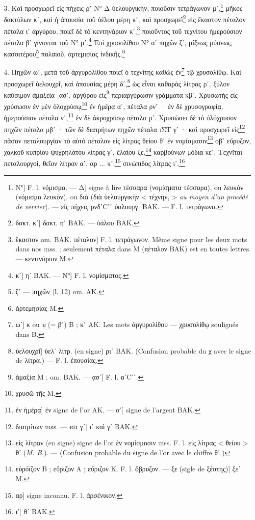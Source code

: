 \documentclass[a4paper, 11pt, oneside, polutonikogreek, french]{article}
\begin{document}
3. Καὶ προσχωρεῖ εἰς πήχεις ρʹ Ν° Δ ὑελουργικὴν, ποιοῦσιν τετράγωνον μʹ,\footnote{Ν°] F. l. νόμισμα. --- Δ] signe à lire τέσσαρα (νομίσματα τέσσαρα), ou λευκὸν (νόμισμα λευκὸν), ou διὰ (διὰ ὑελουργικὴν < τέχνην, > \emph{au moyen d'un procédé de verrier}). --- εἰς πήχεις ρνδʹCʹʹ ὑαλουργ. BAK. --- F. l. τετράγωνα.} μῆκος δακτύλων κʹ, καὶ ἡ ἀπουσία τοῦ ὑέλου μέρη κʹ, καὶ προσχωρεῖ\footnote{δακτ. κʹ] δακτ. ηʹ BAK. --- ὑάλου BAK.} εἰς ἕκαστον πέταλον πέταλα ιʹ ἀργύρου, ποιεῖ δὲ τὸ κεντηνάριον κʹ,\footnote{ἕκαστον om. BAK. πέταλον] F. l. τετράγωνον. Même signe pour les deux mots dans nos mss. ; seulement πέταλα dans M (πέταλον BAK) est en toutes lettres. --- κεντινάριον M.} ποιοῦντος τοῦ τεχνίτου ἡμερούσιον πέταλα βʹ γίνονται τοῦ Ν° μʹ.\footnote{κʹ] ηʹ BAK. --- Ν°] F. l. νομίσματος.} Ἐπὶ χρυσολίθου Ν° αʹ πηχῶν ζʹ, μίξεως μύσεως, κασσιτέρου\footnote{ζʹ --- πηχῶν (l. 12) om. AK.} παλαιοῦ, ἀρτεμισίας ἰνδικῆς.\footnote{ἀρτεμησίας M.}

4. Πηχῶν ωʹ, μετὰ τοῦ ἀργυρολίθου ποιεῖ ὁ τεχνίτης καθὼς ἐν\footnote{ωʹ] κ ou \emph{u} (= βʹ) B ; κʹ AΚ. Les mots ἀργυρολίθου --- χρυσολίθῳ soulignés dans B.} τῷ χρυσολίθῳ. Καὶ προσχωρεῖ ὑελουχρῖ, καὶ ἀπουσίας μέρη δʹ,\footnote{ὑελουχρῖ] ὑελʹ λίτρ. (en signe) ριʹ BAK. (Confusion probable du χ avec le signe de λίτρα.) --- F. l. ἐπουσίας.} ὡς εἶναι καθαρὰς λίτρας ρʹ, ξύλον καύσιμον ἁμαξεία ͵ασʹ, ἀργύρου εἰς\footnote{ἁμαξία M ; om. BAK. --- ᾳσʹ] F. l. αʹCʹʹ.} περιαργύρωσιν γράμματα κβʹ. Χρυσωτὴς εἰς χρύσωσιν ἐν μὲν ὁλοχρύσῳ\footnote{χρυσῶ τῆς M.} ἐν ἡμέρᾳ αʹ, πέταλα ρνʹ · ἐν δὲ χρυσογραφίᾳ, ἡμερούσιον πέταλα νʹ,\footnote{ἐν ἡμέρᾳ] ἐν signe de l'or AK. --- αʹ] signe de l'argent BAK.} ἐν δὲ ἀκροχρύσῳ πέταλα ρʹ. Χρυσώσει δὲ τὸ ὁλόχρυσον πηχῶν πέταλα μβʹ · τῶν δὲ διατρήτων πηχῶν πέταλα ιΣΤ γʹ · καὶ προσχωρεῖ εἰς\footnote{διατρίτων mss. --- ιστ γʹ] ιʹ καὶ γʹ BAK.} πᾶσαν πεταλουργίαν τὸ αὐτὸ πέταλον εἰς λίτρας θείου θʹ ἐν νομίσμασιν\footnote{εἰς λίτραν (en signe) signe de l'or ἐν νομίσμασιν mss. F. l. εἰς λίτρας < θείου > θʹ (\emph{M. B.}). --- (Confusion probable du signe de l'or avec le chiffre θʹ.)} οβʹ εὔρυζον, χαλκοῦ κυπρίου ψυχρηλάτου λίτρας γʹ, ἐλαίου ξε,\footnote{εὐρόϊζον B ; εὕριζον A ; εὔριζον K. F. l. ὄβρυζον. --- ξε (sigle de ξέστης)] ξεʹ M.} καρβούνων μόδια κεʹ. Τεχνῖται πεταλουργοὶ, θεῖον λίτραν αʹ. αρ ... κʹ,\footnote{αρ] signe inconnu. F. l. ἀρσένικον.} σινώπιδος λίτρας ιʹ.\footnote{ιʹ] θʹ BAK.}
\end{document}
